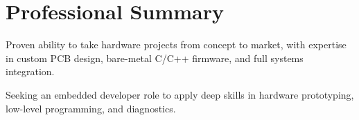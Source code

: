 \section{Professional Summary}
\begin{onecolentry}
    \begin{highlightsforbulletentries}
        \item Proven ability to take hardware projects from concept to market, with expertise in custom PCB design, bare-metal C/C++ firmware, and full systems integration.
        \item Seeking an embedded developer role to apply deep skills in hardware prototyping, low-level programming, and diagnostics.
    \end{highlightsforbulletentries}
\end{onecolentry}